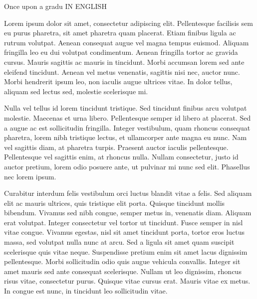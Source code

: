 \justify
Once upon a gradu IN ENGLISH

Lorem ipsum dolor sit amet, consectetur adipiscing elit. Pellentesque facilisis sem eu purus pharetra, sit amet pharetra quam placerat. Etiam finibus ligula ac rutrum volutpat. Aenean consequat augue vel magna tempus euismod. Aliquam fringilla leo eu dui volutpat condimentum. Aenean fringilla tortor ac gravida cursus. Mauris sagittis ac mauris in tincidunt. Morbi accumsan lorem sed ante eleifend tincidunt. Aenean vel metus venenatis, sagittis nisi nec, auctor nunc. Morbi hendrerit ipsum leo, non iaculis augue ultrices vitae. In dolor tellus, aliquam sed lectus sed, molestie scelerisque mi.

Nulla vel tellus id lorem tincidunt tristique. Sed tincidunt finibus arcu volutpat molestie. Maecenas et urna libero. Pellentesque semper id libero at placerat. Sed a augue ac est sollicitudin fringilla. Integer vestibulum, quam rhoncus consequat pharetra, lorem nibh tristique lectus, et ullamcorper ante magna eu nunc. Nam vel sagittis diam, at pharetra turpis. Praesent auctor iaculis pellentesque. Pellentesque vel sagittis enim, at rhoncus nulla. Nullam consectetur, justo id auctor pretium, lorem odio posuere ante, ut pulvinar mi nunc sed elit. Phasellus nec lorem ipsum.

Curabitur interdum felis vestibulum orci luctus blandit vitae a felis. Sed aliquam elit ac mauris ultrices, quis tristique elit porta. Quisque tincidunt mollis bibendum. Vivamus sed nibh congue, semper metus in, venenatis diam. Aliquam erat volutpat. Integer consectetur vel tortor ut tincidunt. Fusce semper in nisl vitae congue. Vivamus egestas, nisl sit amet tincidunt porta, tortor eros luctus massa, sed volutpat nulla nunc at arcu. Sed a ligula sit amet quam suscipit scelerisque quis vitae neque. Suspendisse pretium enim sit amet lacus dignissim pellentesque. Morbi sollicitudin odio quis augue vehicula convallis. Integer sit amet mauris sed ante consequat scelerisque. Nullam ut leo dignissim, rhoncus risus vitae, consectetur purus. Quisque vitae cursus erat. Mauris vitae ex metus. In congue est nunc, in tincidunt leo sollicitudin vitae.